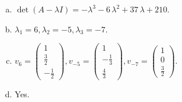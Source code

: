 \begin{questions}
\begin{solution}
\begin{enumerate}[(a)]
\item $\det(A-\lambda I)=-{\lambda}^{3} - 6 \, {\lambda}^{2} + 37 \, {\lambda} + 210$.
\item ${\lambda}_1=6, {\lambda}_2=-5, {\lambda}_3=-7$.
\item $v_{6}=\left(\begin{array}{r}
1 \\
\frac{3}{2} \\
-\frac{1}{2}
\end{array}\right), v_{-5}=\left(\begin{array}{r}
1 \\
-\frac{1}{3} \\
\frac{4}{3}
\end{array}\right), v_{-7}=\left(\begin{array}{r}
1 \\
0 \\
\frac{3}{2}
\end{array}\right)$.
\item Yes.
\end{enumerate}
\end{solution}

\end{questions}

\newpage


\begin{center}
\end{center}

